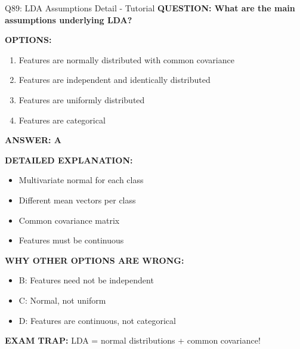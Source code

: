 \documentclass[8pt]{beamer}
\begin{document}
	\begin{frame}{Q89: LDA Assumptions Detail - Tutorial}
		\fontsize{6.5}{7.5}\selectfont
		\textbf{QUESTION: What are the main assumptions underlying LDA?}
		
		\vspace{0.1cm}
		\textbf{OPTIONS:}
		\begin{enumerate}
			\item Features are normally distributed with common covariance
			\item Features are independent and identically distributed
			\item Features are uniformly distributed
			\item Features are categorical
		\end{enumerate}
		
		\vspace{0.1cm}
		\textcolor{myblue}{\textbf{ANSWER: A}}
		
		\vspace{0.1cm}
		\textbf{DETAILED EXPLANATION:}
		\begin{itemize}
			\item Multivariate normal for each class
			\item Different mean vectors per class
			\item Common covariance matrix
			\item Features must be continuous
		\end{itemize}
		
		\vspace{0.1cm}
		\textcolor{myred}{\textbf{WHY OTHER OPTIONS ARE WRONG:}}
		\begin{itemize}
			\item \textcolor{myred}{B:} Features need not be independent
			\item \textcolor{myred}{C:} Normal, not uniform
			\item \textcolor{myred}{D:} Features are continuous, not categorical
		\end{itemize}
		
		\textcolor{myred}{\textbf{EXAM TRAP:}} LDA = \textcolor{myblue}{normal distributions + common covariance}!
	\end{frame}
	
\end{document}
